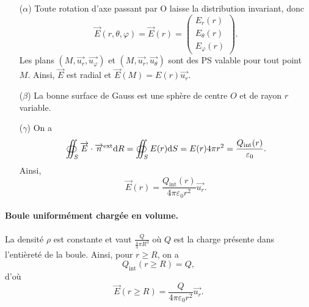             \begin{itemize}
                \item [($\alpha$)] Toute rotation d'axe passant par O laisse la distribution invariant, donc 
                \begin{equation}
                    \vec{E}(r,\theta,\varphi)=\vec{E}(r)=\begin{pmatrix}
                        E_r(r)\\ E_{\theta}(r)\\E_{\varphi}(r)
                    \end{pmatrix}.
                \end{equation}
                Les plans $(M,\vec{u_r},\vec{u_{\varphi}})$ et $(M,\vec{u_r},\vec{u_{\theta}})$ sont des PS valable pour tout point $M$. Ainsi, $\vec{E}$ est radial et $\vec{E}(M)=E(r)\vec{u_r}$.
                \item [($\beta$)] La bonne surface de Gauss est une sphère de centre $O$ et de rayon $r$ variable.
                \item [($\gamma$)] On a 
                \begin{equation}
                    \oiint_{S}\protect\overrightarrow{{E}}\cdot\protect\overrightarrow{{n}}^{\text{ext}}\mathrm{d} R=\oiint_{S}E(r)\mathrm{d} S=E(r)4\pi r^{2}=\frac{Q_{\text{int}}(r)}{\varepsilon_{0}}.
                \end{equation}
                Ainsi,
                \begin{equation}
                    \boxed{
                        \vec{E}(r)=\frac{Q_{\text{int}}(r)}{4\pi\varepsilon_{0}r^{2}}\vec{u_r}.
                    }
                \end{equation}
            \end{itemize}

            \paragraph{Boule uniformément chargée en volume.}

                La densité $\rho$ est constante et vaut $\frac{Q}{\frac{4}{3}\pi R^{3}}$ où $Q$ est la charge présente dans l'entièreté de la boule. Ainsi, pour $r\geqslant R$, on a 
                \begin{equation}
                    Q_{\text{int}}(r\geqslant R)=Q,
                \end{equation}
                d'où
                \begin{equation}
                    \boxed{
                        \vec{E}(r\geqslant R)=\frac{Q}{4\pi\varepsilon_0 r^{2}}\vec{u_r}.
                    }
                \end{equation}


